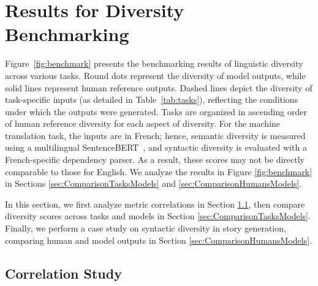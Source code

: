 \documentclass[11pt,a4paper]{article}
\begin{document}
\section{Results for Diversity Benchmarking}\label{sec:benchmarking_results}

Figure~\ref{fig:benchmark} presents the benchmarking results of linguistic diversity across various tasks. Round dots represent the diversity of model outputs, while solid lines represent human reference outputs. Dashed lines depict the diversity of task-specific inputs (as detailed in Table~\ref{tab:tasks}), reflecting the conditions under which the outputs were generated. Tasks are organized in ascending order of human reference diversity for each aspect of diversity. For the machine translation task, the inputs are in French; hence, semantic diversity is measured using a multilingual SentenceBERT~\citep{reimers-gurevych-2020-making}, and syntactic diversity is evaluated with a French-specific dependency parser. As a result, these scores may not be directly comparable to those for English. We analyze the results in Figure \ref{fig:benchmark} in Sections \ref{sec:ComparisonTasksModels} and \ref{sec:ComparisonHumansModels}. 

In this section, we first analyze metric correlations in Section \ref{sec:CorrelationStudy}, then compare diversity scores across tasks and models in Section \ref{sec:ComparisonTasksModels}.	Finally, we perform a case study on syntactic diversity in story generation, comparing human and model outputs in Section \ref{sec:ComparisonHumansModels}.

\subsection{Correlation Study}\label{sec:CorrelationStudy}

\end{document}
